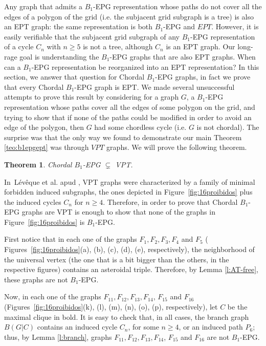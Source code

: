 \documentclass[9pt]{entcs}
\newtheorem{teo}[thm]{Theorem}%
\begin{document}
 Any graph that
admits a $B_1$-EPG representation  whose paths do not cover all the edges of a polygon of the grid (i.e.
the subjacent grid subgraph is a tree)  is also an EPT graph: the same representation is both $B_1$-EPG and $EPT$.
However, it is easily verifiable that the subjacent grid subgraph of any $B_1$-EPG representation of a cycle $C_n$ with $n\geq 5$ is not a tree,
although $C_n$ is an  EPT graph.  Our long-rage goal is 
understanding the $B_1$-EPG graphs that are also EPT graphs. When can a $B_1$-EPG representation
be reorganized into an EPT representation?  In this section,
 we answer that question for Chordal $B_1$-EPG graphs, in fact we prove that every Chordal $B_1$-EPG graph is EPT. We
 made several unsuccessful attempts to prove this result by considering for a graph $G$, a $B_1$-EPG representation whose paths cover all the edges
 of some polygon on the grid, and trying  to show  that if none of the paths could be modified in order to avoid an edge of the polygon,
 then $G$ had some chordless  cycle (i.e. $G$ is not chordal). The surprise was that the only way we found to demonstrate our main Theorem \ref{teo:b1epgept} was through $VPT$ graphs.
 We will prove the following theorem.

\begin{teo}\label{teo:chordalB1inVPT}
Chordal $B_1$-EPG $\subsetneq$ VPT. 
\end{teo}

In~L{\'e}v{\^e}que et al. \cite{leveque2009characterizing} apud \cite{alcon2015characterizing},  VPT graphs were characterized by a family of minimal forbidden induced subgraphs,
the ones depicted in 
Figure~\ref{fig:16proibidos} plus the induced cycles $C_n$ for $n\geq 4$. Therefore, in order to prove
that Chordal $B_1$-EPG graphs are VPT is enough to show that none of the graphs in Figure~\ref{fig:16proibidos} 
is $B_1$-EPG. %

First notice that in each one of the graphs $F_{1}, F_{2}, F_{3}, F_{4}$ and $F_{5}$ ( Figures~\ref{fig:16proibidos}(a), (b), (c), (d), (e), respectively), the neighborhood of the universal vertex (the one that is a bit bigger than the others, in the respective figures) contains an asteroidal triple. Therefore, by Lemma \ref{l:AT-free}, these graphs are not  $B_1$-EPG.

Now, in each one of the graphs $F_{11}, F_{12}, F_{13}, F_{14}$, $F_{15}$ and $F_{16}$  (Figures~\ref{fig:16proibidos}(k), (l), (m), (n), (o), (p), respectively), let $C$ be the maximal clique in bold. It is easy to check that, in all cases, the branch graph $B(G|C)$ contains an induced cycle $C_n$, for some $n\geq 4$, or an induced path $P_6$; thus, by Lemma \ref{l:branch},  graphs $F_{11}, F_{12}, F_{13}, F_{14}$, $F_{15}$ and $F_{16}$ are not $B_1$-EPG.
\end{document}
